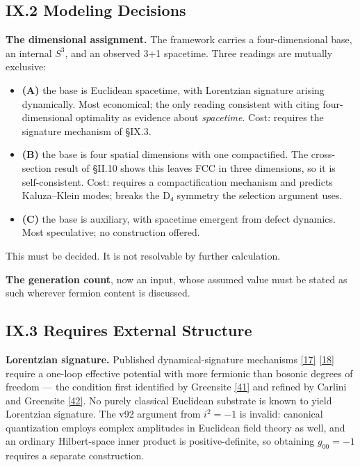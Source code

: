 \documentclass[a4paper,11pt]{article}
\begin{document}
\subsection*{IX.2 Modeling Decisions}

\textbf{The dimensional assignment.} The framework carries a four-dimensional base, an internal $S^3$, and an observed 3+1 spacetime. Three readings are mutually exclusive:

\begin{itemize}
\item \textbf{(A)} the base is Euclidean spacetime, with Lorentzian signature arising dynamically. Most economical; the only reading consistent with citing four-dimensional optimality as evidence about \textit{spacetime}. Cost: requires the signature mechanism of §IX.3.
\item \textbf{(B)} the base is four spatial dimensions with one compactified. The cross-section result of §II.10 shows this leaves FCC in three dimensions, so it is self-consistent. Cost: requires a compactification mechanism and predicts Kaluza–Klein modes; breaks the D₄ symmetry the selection argument uses.
\item \textbf{(C)} the base is auxiliary, with spacetime emergent from defect dynamics. Most speculative; no construction offered.
\end{itemize}

This must be decided. It is not resolvable by further calculation.

\textbf{The generation count}, now an input, whose assumed value must be stated as such wherever fermion content is discussed.

\subsection*{IX.3 Requires External Structure}

\textbf{Lorentzian signature.} Published dynamical-signature mechanisms \hyperref[ref17]{[17]} \hyperref[ref18]{[18]} require a one-loop effective potential with more fermionic than bosonic degrees of freedom — the condition first identified by Greensite \hyperref[ref41]{[41]} and refined by Carlini and Greensite \hyperref[ref42]{[42]}. No purely classical Euclidean substrate is known to yield Lorentzian signature. The v92 argument from $i^2=-1$ is invalid: canonical quantization employs complex amplitudes in Euclidean field theory as well, and an ordinary Hilbert-space inner product is positive-definite, so obtaining $g_{00}=-1$ requires a separate construction.
\end{document}
